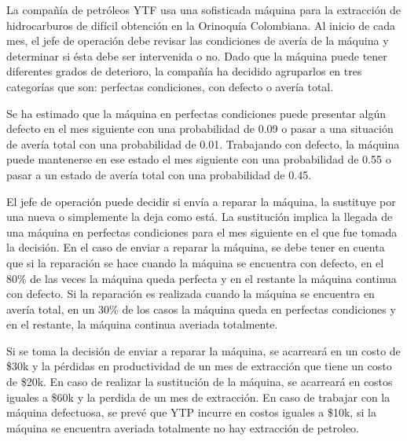 \noindent La compañía de  petróleos YTF usa una sofisticada máquina para la extracción de hidrocarburos de difícil obtención en la Orinoquía Colombiana. Al inicio de cada mes, el jefe de operación debe revisar las condiciones de avería de la máquina y determinar si ésta debe ser intervenida o no. Dado que la máquina puede tener diferentes grados de deterioro, la compañía  ha decidido agruparlos en tres categorías que son: perfectas condiciones, con defecto o avería total. 

\noindent Se ha estimado que la máquina en perfectas condiciones puede presentar algún defecto en el mes siguiente con una probabilidad de 0.09 o pasar a una situación de avería total con una probabilidad de 0.01. Trabajando con defecto, la máquina puede mantenerse en ese estado el mes siguiente con una probabilidad de 0.55 o pasar a un estado de avería total con una probabilidad de 0.45. 

\noindent El jefe de operación puede decidir si envía a reparar la máquina, la sustituye por una nueva o simplemente la deja como está. La sustitución implica la llegada de una máquina en perfectas condiciones para el mes siguiente en el que fue tomada la decisión. En el caso de enviar a reparar la máquina, se debe tener en cuenta que si la reparación se hace cuando la máquina se encuentra con defecto, en el 80\% de las veces la máquina queda perfecta y en el restante la máquina continua con defecto. Si la reparación es realizada cuando la máquina se encuentra en avería total, en un 30\% de los casos la máquina queda en perfectas condiciones y en el restante, la máquina continua averiada totalmente. 

\noindent Si se toma la decisión de enviar a reparar la máquina, se acarreará en un costo de \$30k y la pérdidas en productividad  de un mes de extracción que tiene un costo de \$20k. En caso de realizar la sustitución de la máquina, se acarreará en costos iguales a \$60k y la perdida de un mes de extracción. En caso de trabajar con la máquina defectuosa, se prevé que YTP incurre en costos iguales a \$10k, si la máquina se encuentra averiada totalmente no hay extracción de petroleo.


